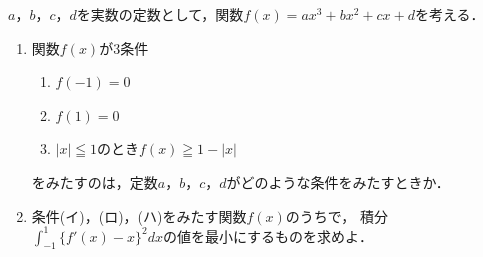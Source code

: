\documentclass[../../main.tex]{subfiles}
\begin{document}
$a$，$b$，$c$，$d$を実数の定数として，関数$f(x)=ax^3+bx^2+cx+d$を考える．
\begin{enumerate}
  \item 関数$f(x)$が3条件
    \begin{enumerate}
      \item[(イ)] $f(-1)=0$
      \item[(ロ)] $f(1)=0$
      \item[(ハ)] $|x|\leqq1$のとき$f(x)\geqq1-|x|$
    \end{enumerate}
    をみたすのは，定数$a$，$b$，$c$，$d$がどのような条件をみたすときか．
  \item 条件(イ)，(ロ)，(ハ)をみたす関数$f(x)$のうちで，
    積分$\displaystyle\int_{-1}^1 { \{ f'(x)-x \} }^2 dx$の値を最小にするものを求めよ．
\end{enumerate}
\end{document}
